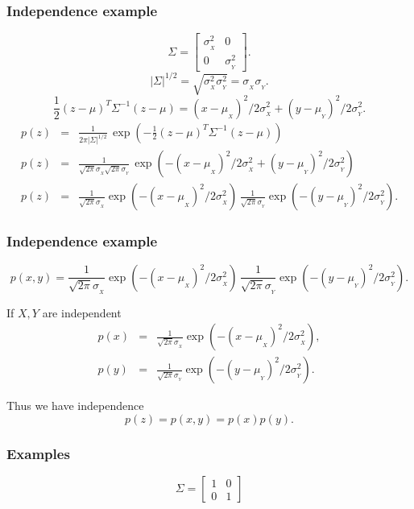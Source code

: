 \begin{frame}[fragile]\frametitle{Independence example}

{\tiny

$$\Sigma=\begin{bmatrix} \sigma_{_X}^2 & 0 \\
0 & \sigma_{_Y}^2 \end{bmatrix}.$$ 
$$|\Sigma|^{1/2} = \sqrt{\sigma_{_X}^2 \sigma_{_Y}^2} = \sigma_{_X}
\sigma_{_Y}.$$  
$$\frac{1}{2} (z-\mu)^T \Sigma^{-1} (z-\mu) = (x-\mu_{_X})^2/2 \sigma_{_X}^2+ 
(y-\mu_{_Y})^2/2 \sigma_{_Y}^2.$$ 
\begin{eqnarray*}
p(z) &=& \frac{1}{2 \pi |\Sigma|^{1/2}} \, \exp\left(-\frac{1}{2}
(z-\mu)^T \Sigma^{-1} (z-\mu)\right) \\ 
p(z) &= &\frac{1}{\sqrt{2 \pi} \sigma_{_X} \sqrt{2 \pi} \sigma_{_Y}
} \, \exp\left(- (x-\mu_{_X})^2/2 \sigma_{_X}^2+ 
(y-\mu_{_Y})^2/2 \sigma_{_Y}^2   \right) \\ 
p(z) &= &\frac{1}{\sqrt{2 \pi} \sigma_{_X}} \exp\left(-
  (x-\mu_{_X})^2/2 \sigma_{_X}^2 \right) \, \frac{1}{\sqrt{2 \pi} \sigma_{_Y}} \exp\left(- (y-\mu_{_Y})^2/2 \sigma_{_Y}^2 \right). 
\end{eqnarray*}


}

\end{frame}


\begin{frame}[fragile]\frametitle{Independence example}

{\tiny

$$p(x,y) = \frac{1}{\sqrt{2 \pi} \sigma_{_X}} \exp\left(-
  (x-\mu_{_X})^2/2 \sigma_{_X}^2 \right) \, \frac{1}{\sqrt{2 \pi}
  \sigma_{_Y}} \exp\left(- (y-\mu_{_Y})^2/2 \sigma_{_Y}^2 \right).$$  

If $X,Y$ are independent
\begin{eqnarray*}
p(x) &=& \frac{1}{\sqrt{2 \pi} \sigma_{_X}} \exp\left(-
  (x-\mu_{_X})^2/2 \sigma_{_X}^2 \right), \\
p(y) &=& \frac{1}{\sqrt{2 \pi} \sigma_{_Y}} \exp\left(-
  (y-\mu_{_Y})^2/2 \sigma_{_Y}^2 \right).
\end{eqnarray*}

Thus we have independence 
$$p(z) = p(x,y) = p(x) p (y).$$


}
\end{frame}

\begin{frame}[fragile]\frametitle{Examples}

$$\Sigma=\begin{bmatrix} 1&0\\0&1 \end{bmatrix}$$

\center{\texttt{[image: g2d1]} } 

\end{frame}





